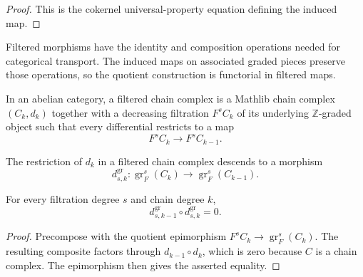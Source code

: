 \begin{proof}
  \leanok
  This is the cokernel universal-property equation defining the induced map.
\end{proof}

\begin{definition}
  \leanok
  \label{def:core-filtered-morphism-functoriality}
  Filtered morphisms have the identity and composition operations needed for
  categorical transport.  The induced maps on associated graded pieces
  preserve those operations, so the quotient construction is functorial in
  filtered maps.
\end{definition}

\begin{definition}
  \leanok
  \label{def:core-filtered-chain-complex}
  In an abelian category, a filtered chain complex is a Mathlib chain complex
  $(C_k,d_k)$ together with a decreasing filtration $F^sC_k$ of its underlying
  $\mathbb Z$-graded object such that every differential restricts to a map
  \[
    F^sC_k\longrightarrow F^sC_{k-1}.
  \]
\end{definition}

\begin{definition}
  \leanok
  \label{def:core-associated-graded-differential}
  The restriction of $d_k$ in a filtered chain complex descends to a morphism
  \[
    d^{\operatorname{gr}}_{s,k}:
    \operatorname{gr}^s_F(C_k)\longrightarrow
    \operatorname{gr}^s_F(C_{k-1}).
  \]
\end{definition}

\begin{theorem}
  \leanok
  \label{thm:core-associated-graded-differential-sq}
  For every filtration degree $s$ and chain degree $k$,
  \[
    d^{\operatorname{gr}}_{s,k-1}\circ
    d^{\operatorname{gr}}_{s,k}=0.
  \]
\end{theorem}

\begin{proof}
  \leanok
  Precompose with the quotient epimorphism $F^sC_k\longrightarrow
  \operatorname{gr}^s_F(C_k)$.  The resulting composite factors through
  $d_{k-1}\circ d_k$, which is zero because $C$ is a chain complex.  The
  epimorphism then gives the asserted equality.
\end{proof}
